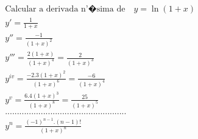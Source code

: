 \begin{ex}
\begin{align}
&\text{Calcular a derivada n'�sima de}\quad y=\ln{(1+x)}\nonumber\\
&y'=\frac{1}{1+x}\nonumber\\
&y''=\frac{-1}{(1+x)^2}\nonumber\\
&y'''=\frac{2(1+x)}{(1+x)^4}=\frac{2}{(1+x)^3}\nonumber\\
&y^{iv}=\frac{-2.3(1+x)^2}{(1+x)^6}=\frac{-6}{(1+x)^4}\nonumber\\
&y^{v}=\frac{6.4(1+x)^3}{(1+x)^8}=\frac{25}{(1+x)^5}\nonumber\\
&...................................................\nonumber\\
&y^{n}=\frac{(-1)^{n-1}.(n-1)!}{(1+x)^n}\nonumber
\end{align}
\end{ex}